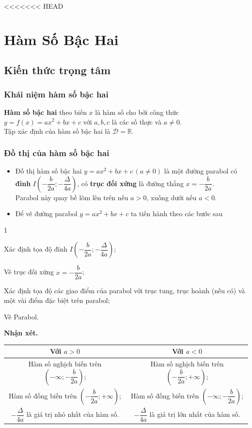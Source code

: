 <<<<<<< HEAD
\setcounter{section}{1}
\section{Hàm Số Bậc Hai}
\subsection{Kiến thức trọng tâm}
\subsubsection{Khái niệm hàm số bậc hai}
\begin{tcolorbox}
\textbf{Hàm số bậc hai} theo biến $x$ là hàm số cho bởi công thức $y=f(x)=ax^2+bx+c$ với $a,b,c$ là các số thực và $a\neq 0$.\\
Tập xác định của hàm số bậc hai là $\mathscr{D}= \mathbb{R}$.
\end{tcolorbox}
\subsubsection{Đồ thị của hàm số bậc hai}
\begin{tcolorbox}
\begin{itemize}
	\item Đồ thị hàm số bậc hai $y=ax^2+bx+c\,(a\ne 0)$ là một đường parabol có \textbf{đỉnh} $I\left(-\dfrac{b}{2a};-\dfrac{\Delta}{4a}\right)$, có \textbf{trục đối xứng} là đường thẳng $x=-\dfrac{b}{2a}$. \\
	Parabol này quay bề lõm lên trên nếu $a>0$, xuống dưới nếu $a<0$.
	\item Để vẽ đường parabol $y=ax^2+bx+c$ ta tiến hành theo các bước sau
\end{itemize}
\begin{enumEX}{1}
\item Xác định tọa độ đỉnh $I\left(-\dfrac{b}{2a};-\dfrac{\Delta}{4a}\right)$;
\item Vẽ trục đối xứng $x=-\dfrac{b}{2a}$;
\item Xác định tọa độ các giao điểm của parabol với trục tung, trục hoành (nếu có) và một vài điểm đặc biệt trên parabol; 
\item Vẽ Parabol.
\end{enumEX}
\end{tcolorbox}
\textbf{Nhận xét.}
\begin{center}
\begin{tabular}{|c|c|}
\hline
Với $a>0$& Với $a<0$\\
\hline
Hàm số nghịch biến trên $\left(-\infty;-\dfrac{b}{2a}\right)$;&Hàm số nghịch biến trên $\left(-\dfrac{b}{2a};+\infty\right)$;\\
Hàm số đồng biến trên $\left(-\dfrac{b}{2a};+\infty\right)$;&Hàm số đồng biến trên $\left(-\infty;-\dfrac{b}{2a}\right)$;\\ $-\dfrac{\Delta}{4a}$ là giá trị nhỏ nhất của hàm số.&$-\dfrac{\Delta}{4a}$ là giá trị lớn nhất của hàm số.\\
\hline	
\end{tabular}
\end{center}
